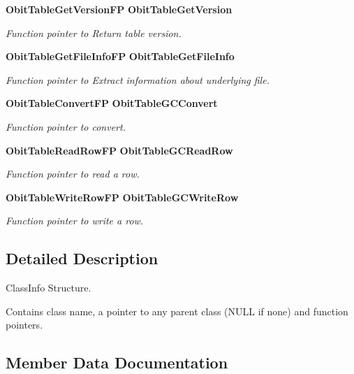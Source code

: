 \begin{CompactItemize}
{\bf Obit\-Table\-Get\-Version\-FP} {\bf Obit\-Table\-Get\-Version}
\begin{CompactList}\small\item\em Function pointer to Return table version. \item\end{CompactList}\item 
{\bf Obit\-Table\-Get\-File\-Info\-FP} {\bf Obit\-Table\-Get\-File\-Info}
\begin{CompactList}\small\item\em Function pointer to Extract information about underlying file. \item\end{CompactList}\item 
{\bf Obit\-Table\-Convert\-FP} {\bf Obit\-Table\-GCConvert}
\begin{CompactList}\small\item\em Function pointer to convert. \item\end{CompactList}\item 
{\bf Obit\-Table\-Read\-Row\-FP} {\bf Obit\-Table\-GCRead\-Row}
\begin{CompactList}\small\item\em Function pointer to read a row. \item\end{CompactList}\item 
{\bf Obit\-Table\-Write\-Row\-FP} {\bf Obit\-Table\-GCWrite\-Row}
\begin{CompactList}\small\item\em Function pointer to write a row. \item\end{CompactList}\end{CompactItemize}


\subsection{Detailed Description}
Class\-Info Structure. 

Contains class name, a pointer to any parent class (NULL if none) and function pointers. 



\subsection{Member Data Documentation}
